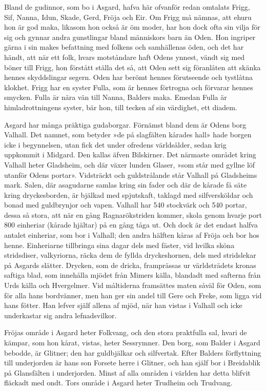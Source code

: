 Bland de gudinnor, som bo i Asgard, hafva här ofvanför redan omtalats
Frigg, Sif, Nanna, Idun, Skade, Gerd, Fröja och Eir. Om Frigg må nämnas,
att ehuru hon är god maka, likasom hon också är öm moder, har hon dock
ofta sin vilja för sig och gynnar andra gunstlingar bland människors
barn än Oden. Hon ingriper gärna i sin makes befattning med folkens och
samhällenas öden, och det har händt, att när ett folk, hvars motståndare
haft Odens ynnest, vändt sig med böner till Frigg, hon förstått ställa
det så, att Oden sett sig föranlåten att skänka hennes skyddslingar
segern. Oden har berömt hennes förutseende och tystlåtna klokhet. Frigg
har en syster Fulla, som är hennes förtrogna och förvarar hennes
smycken. Fulla är nära vän till Nanna, Balders maka. Emedan Fulla är
himladrottningens syster, bär hon, till tecken af sin värdighet, ett
diadem.

Asgard har många präktiga gudaborgar. Förnämst bland dem är Odens borg
Valhall. Det namnet, som betyder »de på slagfälten kårades hall» hade
borgen icke i begynnelsen, utan fick det under ofredens världsålder,
sedan krig uppkommit i Midgard. Den kallas äfven
Bilskirner. Det
närmaste området kring Valhall heter Gladsheim, och där växer lunden
Glaser, »som står med gyllne löf utanför Odens portar». Vidsträckt och
guldstrålande står Valhall på Gladsheims mark. Salen, där asagudarne
samlas kring sin fader och där de kårade få säte kring dryckesborden, är
bjälkad med spjutskaft, taklagd med silfversköldar och bonad med
guldbrynjor och vapen. Valhall har 540 stockvärk och 540 portar, dessa
så stora, att när en gång Ragnarökstriden kommer, skola genom hvarje
port 800 einheriar (kårade hjältar) på en gång
tåga ut. Och dock är det endast halfva antalet einheriar, som bor i
Valhall; den andra hälften kåras af Fröja och bor hos henne. Einheriarne
tillbringa sina dagar dels med fäster, vid hvilka sköna stridsdiser,
valkyriorna, räcka dem de fyllda dryckeshornen, dels med stridslekar på
Asgards slätter. Drycken, som de dricka, framprässas ur världsträdets
kronas saftiga blad, som innehålla mjödet från Mimers källa, blandadt
med safterna från Urds källa och Hvergelmer. Vid måltiderna framsättes
maten såväl för Oden, som för alla hans bordvänner, men han ger sin
andel till Gere och Freke, som ligga vid hans fötter. Han lefver själf
allena af mjöd, när han vistas i Valhall och icke underkastar sig andra
lefnadsvilkor.

Fröjas område i Asgard heter Folkvang, och den stora praktfulla sal,
hvari de kämpar, som hon kårat, vistas, heter Sessrymner. Den borg, som
Balder i Asgard bebodde, är Glitner; den har guldbjälkar och silfvertak.
Efter Balders förflyttning till underjorden är hans son Forsete herre i
Glitner, och han själf bor i Breidablik på Glansfälten i underjorden.
Minst af alla områden i världen har detta blifvit fläckadt med ondt.
Tors område i Asgard heter Trudheim och Trudvang.

